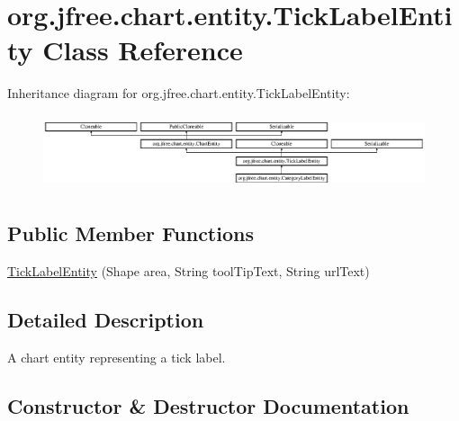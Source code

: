\hypertarget{classorg_1_1jfree_1_1chart_1_1entity_1_1_tick_label_entity}{}\section{org.\+jfree.\+chart.\+entity.\+Tick\+Label\+Entity Class Reference}
\label{classorg_1_1jfree_1_1chart_1_1entity_1_1_tick_label_entity}
Inheritance diagram for org.\+jfree.\+chart.\+entity.\+Tick\+Label\+Entity\+:\begin{figure}[H]
\begin{center}
\leavevmode
\includegraphics[height=2.204725cm]{classorg_1_1jfree_1_1chart_1_1entity_1_1_tick_label_entity}
\end{center}
\end{figure}
\subsection*{Public Member Functions}
\begin{DoxyCompactItemize}
\item 
\mbox{\hyperlink{classorg_1_1jfree_1_1chart_1_1entity_1_1_tick_label_entity_a3688bb98208eb64b2cddfec631046d3c}{Tick\+Label\+Entity}} (Shape area, String tool\+Tip\+Text, String url\+Text)
\end{DoxyCompactItemize}


\subsection{Detailed Description}
A chart entity representing a tick label. 

\subsection{Constructor \& Destructor Documentation}
\mbox{\label{classorg_1_1jfree_1_1chart_1_1entity_1_1_tick_label_entity_a3688bb98208eb64b2cddfec631046d3c}} 
